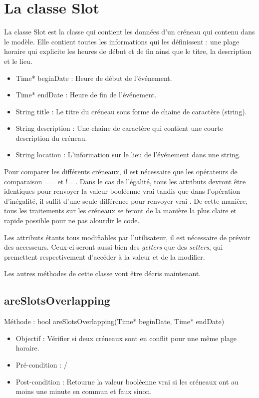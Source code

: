             
	\section{La classe Slot}    
	La classe Slot est la classe qui contient les données d'un créneau qui contenu dans le modèle. Elle contient toutes les informations qui les définissent : une plage horaire qui explicite les heures de début et de fin ainsi que le titre, la description et le lieu. 
	\begin{itemize}
		\item Time* beginDate : Heure de début de l'événement.
		\item Time* endDate : Heure de fin de l'événement.
		\item String title : Le titre du créneau sous forme de chaine de caractère (string).
		\item String description : Une chaine de caractère qui contient une courte description du créneau.
		\item String location : L'information sur le lieu de l'événement dans une string.
	\end{itemize}
	
	Pour comparer les différents créneaux, il est nécessaire que les opérateurs de comparaison \og == \fg{}  et \og != \fg{}. Dans le cas de l'égalité, tous les attributs devront être identiques pour renvoyer la valeur booléenne \og vrai \fg{} tandis que dans l'opération d'inégalité, il suffit d'une seule différence pour renvoyer \og vrai \fg{}. De cette manière, tous les traitements sur les créneaux se feront de la manière la plus claire et rapide possible pour ne pas alourdir le code.
	
	Les attributs étants tous modifiables par l'utilisateur, il est nécessaire de prévoir des accesseurs. Ceux-ci seront aussi bien des \textit{getters} que des \textit{setters}, qui premettent respectivement d'accéder à la valeur et de la modifier.
	
	Les autres méthodes de cette classe vont être décris maintenant.
   		\subsection*{areSlotsOverlapping}
            Méthode : bool areSlotsOverlapping(Time* beginDate, Time* endDate)
			\begin{itemize}
				\item Objectif  : Vérifier si deux créneaux sont en conflit pour une même plage horaire.
				\item Pré-condition : /
				\item Post-condition : Retourne la valeur booléenne \og vrai \fg{} si les créneaux ont au moins une minute en commun et faux sinon.
			\end{itemize}


